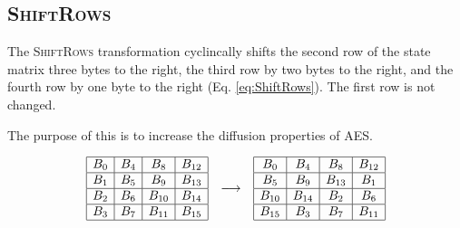\subsection{\textsc{ShiftRows}}

The \textsc{ShiftRows} transformation cyclincally shifts the second row of the state matrix three bytes to the right, the third row by two bytes to the right, and the fourth row by one byte to the right (Eq. \ref{eq:ShiftRows}).
The first row is not changed.

The purpose of this is to increase the diffusion properties of AES.

\begin{equation}
    \begin{array}{c@{\quad \longrightarrow \quad}c}
        \begin{array}{|c|c|c|c|}
        \hline
        B_0 & B_4 & B_8 & B_{12} \\
        \hline
        B_1 & B_5 & B_9 & B_{13} \\
        \hline
        B_2 & B_6 & B_{10} & B_{14} \\
        \hline
        B_3 & B_7 & B_{11} & B_{15} \\
        \hline
        \end{array}
    &
    \begin{array}{|c|c|c|c|}
        \hline
        B_0 & B_4 & B_8 & B_{12} \\
        \hline
        B_5 & B_9 & B_{13} & B_1 \\
        \hline
        B_{10} & B_{14} & B_2 & B_6 \\
        \hline
        B_{15} & B_3 & B_7 & B_{11} \\
        \hline
        \end{array}
    \end{array}
    \label{eq:ShiftRows}
\end{equation}